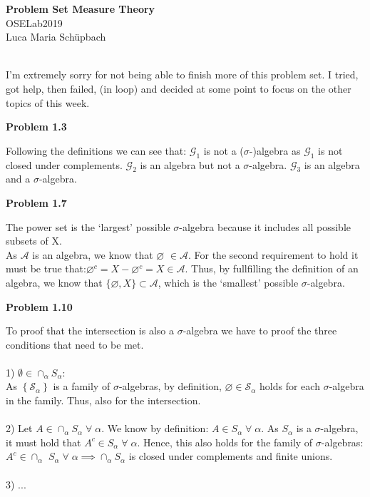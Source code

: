 \documentclass[letterpaper,12pt]{article}
\theoremstyle{definition}
\begin{document}
\begin{flushleft}
  \textbf{\large{Problem Set Measure Theory}} \\
  OSELab2019\\
  Luca Maria Schüpbach
\end{flushleft}
\\I'm extremely sorry for not being able to finish more of this problem set. I tried, got help, then failed, (in loop) and decided at some point to focus on the other topics of this week.

\vspace{5mm}

\noindent\textbf{Problem 1.3}

Following the definitions we can see that: $\mathcal{G}_{1}$ is not a ($\sigma$-)algebra as  $\mathcal{G}_{1}$ is not closed under complements. $\mathcal{G}_{2}$ is an algebra but not a $\sigma$-algebra. $\mathcal{G}_{3}$ is an algebra and a $\sigma$-algebra.

\vspace{5mm}
\noindent\textbf{Problem 1.7}

The power set is the `largest' possible $\sigma$-algebra because it includes all possible subsets of X.
\\ As $\mathcal{A}$ is an algebra, we know that $\varnothing$ $\in \mathcal{A}$. For the second requirement to hold it must be true that:$\varnothing^c= X-\varnothing^c = X \in\mathcal{A}$. Thus, by fullfilling the definition of an algebra, we know that $\{\varnothing, X\} \subset \mathcal{A}$, which is the `smallest' possible $\sigma$-algebra.

\vspace{5mm}
\noindent\textbf{Problem 1.10}

To proof that the intersection is also a $\sigma$-algebra we have to proof the three conditions that need to be met. \\
\\ 1) $\emptyset \in \cap_{\alpha} S_{\alpha}:$\\ As $\left\{\mathcal{S}_{\alpha}\right\}$ is a family of $\sigma$-algebras, by definition, $\varnothing\in \mathcal{S}_{\alpha}$ holds for each $\sigma$-algebra in the family. Thus, also for the intersection. \\
\\ 2) Let $A \in \cap_{\alpha} S_{\alpha}\;\forall\;\alpha$. We know by definition: $A \in S_{\alpha}\;\forall\;\alpha$. As $S_{\alpha}$ is a $\sigma$-algebra, it must hold that  $A^c\in S_{\alpha}\;\forall\;\alpha$. Hence, this also holds for the family of $\sigma$-algebras: $A^c \in \cap_{\alpha}$ $S_{\alpha}\;\forall\;\alpha\implies\cap_{\alpha} S_{\alpha}$
is closed under complements and finite unions.\\
\\ 3) ...
\end{document}
